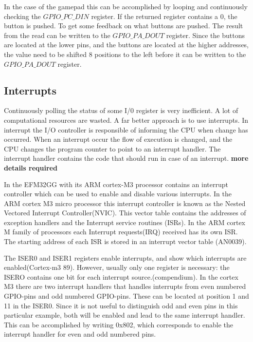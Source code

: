In the case of the gamepad this can be accomplished by looping and continuously checking the $GPIO\_PC\_DIN$ register. If the returned register contains a 0, the button is pushed. To get some feedback on what buttons are pushed. The result from the read can be written to the $GPIO\_PA\_DOUT$ register. Since the buttons are located at the lower pins, and the buttons are located at the higher addresses, the value need to be shifted 8 positions to the left before it can be written to the $GPIO\_PA\_DOUT$ register. 

\subsection{Interrupts}\label{ch:interrupts}
Continuously polling the status of some I/0 register is very inefficient. A lot of computational resources are wasted. A far better approach is to use interrupts. In interrupt the I/O controller is responsible of informing the CPU when change has occurred. When an interrupt occur the flow of execution is changed, and the CPU changes the program counter to point to an interrupt handler. The interrupt handler contains the code that should run in case of an interrupt. {\bf more details required}

In the EFM32GG with its ARM cortex-M3 processor contains an interrupt controller which can be used to enable and disable various interrupts. In the ARM cortex M3 micro processor this interrupt controller is known as the Nested Vectored Interrupt Controller(NVIC). This vector table contains the addresses of exception handlers and the Interrupt service routines (ISRs). In the ARM cortex M family of processors each Interrupt requests(IRQ) received has its own ISR. The starting address of each ISR is stored in an interrupt vector table (AN0039). 

The ISER0 and ISER1 registers enable interrupts, and show which interrupts are enabled(Cortex-m3 89). However, usually only one register is necessary: the ISERO contains one bit for each interrupt source.(compendium). In the cortex M3 there are two interrupt handlers that handles interrupts from even numbered GPIO-pins and odd numbered GPIO-pins. These can be located at position 1 and 11 in the ISER0. Since it is not useful to distinguish odd and even pins in this particular example, both will be enabled and lead to the same interrupt handler. This can be accomplished by writing 0x802, which corresponds to enable the interrupt handler for even and odd numbered pins.

